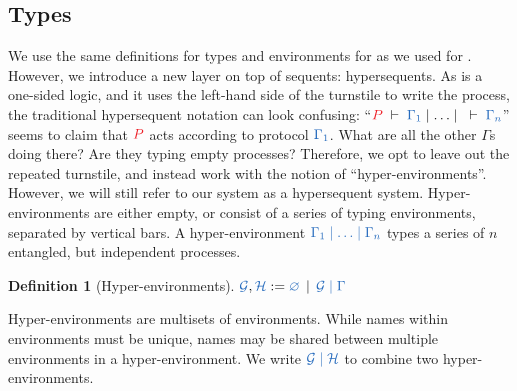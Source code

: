 \documentclass[submission,copyright,creativecommons]{eptcs}
\newtheorem{definition}[lemma]{Definition}
\begin{document}
\subsection{Types}
We use the same definitions for types and environments for \hcp as we used for \cp. However, we introduce a new layer on top of sequents: hypersequents. As \cp is a one-sided logic, and it uses the left-hand side of the turnstile to write the process, the traditional hypersequent notation can look confusing: ``$\seq[P]{\Gamma_1}\hsep\dots\hsep\seq{\Gamma_n}$'' seems to claim that $\tm{P}$ acts according to protocol $\ty{\Gamma_1}$. What are all the other $\Gamma$s doing there? Are they typing empty processes? Therefore, we opt to leave out the repeated turnstile, and instead work with the notion of ``hyper-environments''. However, we will still refer to our system as a hypersequent system. Hyper-environments are either empty, or consist of a series of typing environments, separated by vertical bars. A hyper-environment $\ty{\Gamma_1 \hsep \dots \hsep \Gamma_n}$ types a series of $n$ entangled, but independent processes.
\begin{definition}[Hyper-environments]\label{def:hcp-hyper-environment}
  $\ty{\mathcal{G}}, \ty{\mathcal{H}} := \ty{\emptyhypercontext} \, \mid \, \ty{\mathcal{G} \hsep \Gamma}$
\end{definition}\noindent
Hyper-environments are multisets of environments. While names within environments must be unique, names may be shared between multiple environments in a hyper-environment. We write $\ty{\mathcal{G} \hsep \mathcal{H}}$ to combine two hyper-environments.
\end{document}
